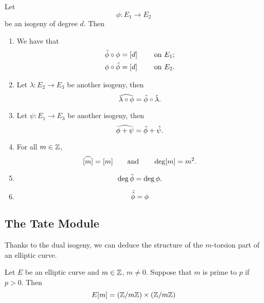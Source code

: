 \begin{theorem}
	\label{thm:dual-isogeny-properties}
	Let
	\begin{equation*}
		\phi: E_1 \to E_2
	\end{equation*}
	be an isogeny of degree $d$. Then 
	\begin{enumerate}[label=(\alph*)]
		\item We have that
			\begin{align*}
				\Hat\phi \circ \phi &= [d] \qquad \textrm { on } E_1;\\
				\phi \circ \Hat\phi &= [d] \qquad \textrm { on } E_2.
			\end{align*}
		\item Let $\lambda: E_2 \to E_3$ be another isogeny, then
			\begin{equation*}
				\widehat{\lambda\circ\phi} = \Hat\phi \circ \Hat\lambda.
			\end{equation*}
		\item Let $\psi: E_1 \to E_3$ be another isogeny, then
			\begin{equation*}
				\widehat{\phi + \psi} = \Hat\phi + \Hat\psi.
			\end{equation*}
		\item For all $m \in \mathbb{Z}$,
			\begin{equation*}
				\widehat{[m]} = [m]
				\qquad\text{and}\qquad
				\deg [m] = m^2.
			\end{equation*}
		\item 
			\begin{equation*}
				\deg \Hat \phi = \deg \phi.
			\end{equation*}
		\item
			\begin{equation*}
				\Hat{\Hat{\phi}} = \phi
			\end{equation*}
	\end{enumerate}
\end{theorem}

\subsection{The Tate Module}


Thanks to the dual isogeny, we can deduce the structure of
the $m$-torsion part of an elliptic curve.
\begin{proposition}
	\label{prop:E-m-structure}
	Let $E$ be an elliptic curve and $m \in \mathbb{Z}$, $m \neq 0$.
	Suppose that $m$
	is prime to $p$ if $p > 0$. Then
	\begin{equation*}
		E[m] = (\mathbb{Z}/m\mathbb{Z})\times (\mathbb{Z}/m\mathbb{Z})
	\end{equation*}
\end{proposition}

